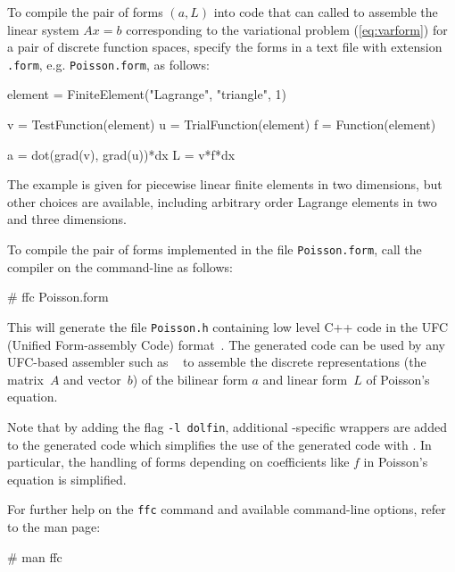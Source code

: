 To compile the pair of forms $(a, L)$ into code that can called to
assemble the linear system $A x = b$ corresponding to the variational
problem (\ref{eq:varform}) for a pair of discrete function spaces,
specify the forms in a text file with extension \texttt{.form},
e.g. \texttt{Poisson.form}, as follows:
\begin{code}
element = FiniteElement("Lagrange", "triangle", 1)

v = TestFunction(element)
u = TrialFunction(element)
f = Function(element)
  
a = dot(grad(v), grad(u))*dx
L = v*f*dx
\end{code}

The example is given for piecewise linear finite elements in two
dimensions, but other choices are available, including arbitrary order
Lagrange elements in two and three dimensions.

To compile the pair of forms implemented in the file
\texttt{Poisson.form}, call the compiler on the command-line as
follows:
\begin{code}
# ffc Poisson.form
\end{code}
This will generate the file \texttt{Poisson.h} containing low level
C++ code in the UFC (Unified Form-assembly Code)
format~\cite{www:ufc,ufcmanual}. The generated code can be used by
any UFC-based assembler such as \dolfin{}~\cite{www:dolfin} to
assemble the discrete representations (the matrix~$A$ and vector~$b$)
of the bilinear form $a$ and linear form~$L$ of Poisson's equation.

Note that by adding the flag \texttt{-l dolfin}, additional
\dolfin{}-specific wrappers are added to the generated code which
simplifies the use of the generated code with \dolfin{}. In
particular, the handling of forms depending on coefficients like $f$
in Poisson's equation is simplified.

For further help on the \texttt{ffc} command and available
command-line options, refer to the \ffc{} man page:
\begin{code}
# man ffc
\end{code}

